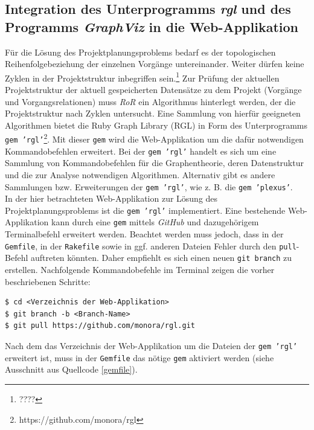 \documentclass[a4paper,12pt,parskip,bibtotoc,liststotoc]{article}
\begin{document}
\subsection{Integration des Unterprogramms \textit{\glqq rgl\grqq} und des Programms \textit{GraphViz} in die Web-Applikation}\label{rgl-kapitel}
Für die Lösung des Projektplanungsproblems bedarf es der topologischen Reihenfolgebeziehung der einzelnen Vorgänge untereinander. Weiter dürfen keine Zyklen in der Projektstruktur inbegriffen sein.\footnote{????} Zur Prüfung der aktuellen Projektstruktur der aktuell gespeicherten Datensätze zu dem Projekt (Vorgänge und Vorgangsrelationen) muss \textit{RoR} ein Algorithmus hinterlegt werden, der die Projektstruktur nach Zyklen untersucht. Eine Sammlung von hierfür geeigneten Algorithmen bietet die Ruby Graph Library (RGL) in Form des Unterprogramms \texttt{gem 'rgl'}\footnote{https://github.com/monora/rgl}. Mit dieser \texttt{gem} wird die Web-Applikation um die dafür notwendigen Kommandobefehlen erweitert. Bei der \texttt{gem 'rgl'} handelt es sich um eine Sammlung von Kommandobefehlen für die Graphentheorie, deren Datenstruktur und die zur Analyse notwendigen Algorithmen. Alternativ gibt es andere Sammlungen bzw. Erweiterungen der \texttt{gem 'rgl'}, wie z. B. die \texttt{gem 'plexus'}.\\

In der hier betrachteten Web-Applikation zur Lösung des Projektplanungsproblems ist die \texttt{gem 'rgl'} implementiert. Eine bestehende Web-Applikation kann durch eine \texttt{gem} mittels \textit{GitHub} und dazugehörigem Terminalbefehl erweitert werden. Beachtet werden muss jedoch, dass in der \texttt{Gemfile}, in der \texttt{Rakefile} sowie in ggf. anderen Dateien Fehler durch den \texttt{pull}-Befehl auftreten könnten. Daher empfiehlt es sich einen neuen \texttt{git branch} zu erstellen. Nachfolgende Kommandobefehle im Terminal zeigen die vorher beschriebenen Schritte:  
\begin{lstlisting}[style=Befehl]
$ cd <Verzeichnis der Web-Applikation>
$ git branch -b <Branch-Name>
$ git pull https://github.com/monora/rgl.git
\end{lstlisting}

Nach dem das Verzeichnis der Web-Applikation um die Dateien der \texttt{gem 'rgl'} erweitert ist, muss in der \texttt{Gemfile} das nötige \texttt{gem} aktiviert werden (siehe Ausschnitt aus Quellcode \ref{gemfile}).


\end{document}
